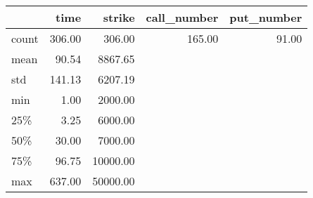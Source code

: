 \begin{tabular}{lrrrr}
\toprule
{} &   time &   strike &  call\_number &  put\_number \\
\midrule
count & 306.00 &   306.00 &       165.00 &       91.00 \\
mean  &  90.54 &  8867.65 &              &             \\
std   & 141.13 &  6207.19 &              &             \\
min   &   1.00 &  2000.00 &              &             \\
25\%   &   3.25 &  6000.00 &              &             \\
50\%   &  30.00 &  7000.00 &              &             \\
75\%   &  96.75 & 10000.00 &              &             \\
max   & 637.00 & 50000.00 &              &             \\
\bottomrule
\end{tabular}
